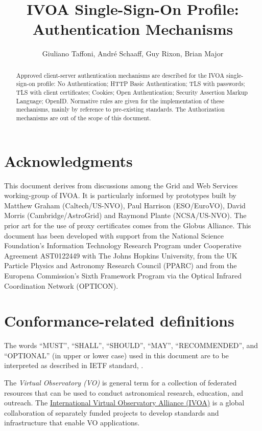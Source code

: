 \documentclass[11pt,a4paper]{ivoa}
\title{IVOA Single-Sign-On Profile: Authentication Mechanisms}
\author{Giuliano Taffoni,  Andr\'e Schaaff, Guy Rixon, Brian Major}
\begin{document}
\begin{abstract}
Approved client-server authentication mechanisms are described for the IVOA single-sign-on profile: No Authentication; HTTP Basic Authentication; TLS with passwords; TLS with client certificates; Cookies; Open Authentication; Security Assertion Markup Language; OpenID. Normative rules are given for the implementation of these mechanisms, mainly by reference to pre-existing standards. The Authorization mechanisms are out of the scope of this document.
\end{abstract}


\section*{Acknowledgments}

This document derives from discussions among the Grid and Web Services working-group of IVOA. It is particularly informed by prototypes built by Matthew Graham (Caltech/US-NVO), Paul Harrison (ESO/EuroVO), David Morris (Cambridge/AstroGrid) and Raymond Plante (NCSA/US-NVO). The prior art for the use of proxy certificates comes from the Globus Alliance.
This document has been developed with support from the National Science Foundation's Information Technology Research Program under Cooperative Agreement AST0122449 with The Johns Hopkins University, from the UK Particle Physics and Astronomy Research Council (PPARC) and from the Europena Commission's Sixth Framework Program via the Optical Infrared Coordination Network (OPTICON).


\section*{Conformance-related definitions}
The words ``MUST'', ``SHALL'', ``SHOULD'', ``MAY'', ``RECOMMENDED'', and
``OPTIONAL'' (in upper or lower case) used in this document are to be
interpreted as described in IETF standard, \citet{std:RFC2119}.

The \emph{Virtual Observatory (VO)} is
general term for a collection of federated resources that can be used
to conduct astronomical research, education, and outreach.
The \href{http://www.ivoa.net}{International
Virtual Observatory Alliance (IVOA)} is a global
collaboration of separately funded projects to develop standards and
infrastructure that enable VO applications.
\end{document}
